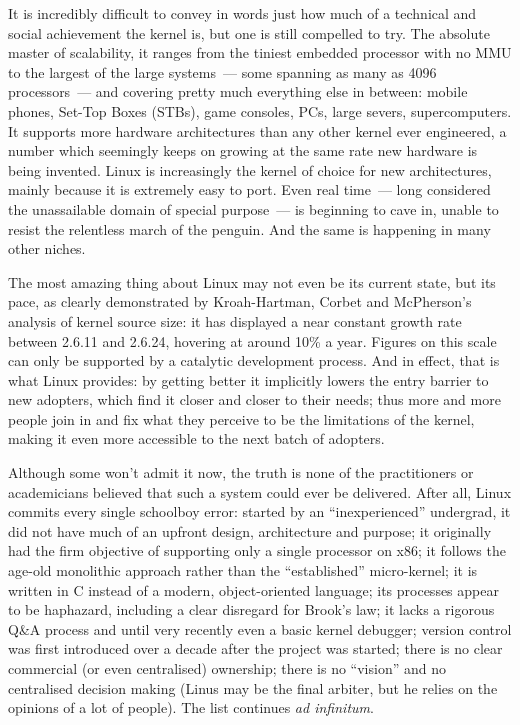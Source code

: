 \documentclass{book}
\begin{document}
It is incredibly difficult to convey in words just how much of a
technical and social achievement the kernel is, but one is still
compelled to try. The absolute master of scalability, it ranges from
the tiniest embedded processor with no MMU to the largest of the large
systems~--- some spanning as many as 4096 processors~--- and
covering pretty much everything else in between: mobile phones,
Set-Top Boxes (STBs), game consoles, PCs, large severs,
supercomputers. It supports more hardware architectures than any other
kernel ever engineered, a number which seemingly keeps on growing at
the same rate new hardware is being invented. Linux is increasingly
the kernel of choice for new architectures, mainly because it is
extremely easy to port. Even real time~--- long considered the
unassailable domain of special purpose~--- is beginning to cave in,
unable to resist the relentless march of the penguin. And the same is
happening in many other niches.

The most amazing thing about Linux may not even be its current state,
but its pace, as clearly demonstrated by Kroah-Hartman, Corbet and
McPherson's analysis of kernel source size: it has displayed a near
constant growth rate between 2.6.11 and 2.6.24, hovering at around
10\% a year. Figures on this scale can only be supported by a
catalytic development process. And in effect, that is what Linux
provides: by getting better it implicitly lowers the entry barrier to
new adopters, which find it closer and closer to their needs; thus
more and more people join in and fix what they perceive to be the
limitations of the kernel, making it even more accessible to the next
batch of adopters.

Although some won't admit it now, the truth is none of the
practitioners or academicians believed that such a system could ever
be delivered. After all, Linux commits every single schoolboy error:
started by an ``inexperienced'' undergrad, it did not have much of an
upfront design, architecture and purpose; it originally had the firm
objective of supporting only a single processor on x86; it follows the
age-old monolithic approach rather than the ``established''
micro-kernel; it is written in C instead of a modern, object-oriented
language; its processes appear to be haphazard, including a clear
disregard for Brook's law; it lacks a rigorous Q\&A process and until
very recently even a basic kernel debugger; version control was first
introduced over a decade after the project was started; there is no
clear commercial (or even centralised) ownership; there is no
``vision'' and no centralised decision making (Linus may be the final
arbiter, but he relies on the opinions of a lot of people). The list
continues \emph{ad infinitum}.
\end{document}
